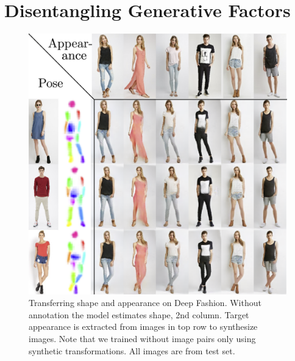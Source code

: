 \section{Disentangling Generative Factors}
	\begin{figure}[t]
		\centering
		\includegraphics[trim={0cm 0cm 0cm 0cm},clip, width=1.\linewidth]{fig/swappy}
		\caption{Transferring shape and appearance on Deep Fashion. Without annotation the model estimates shape, 2nd column. Target appearance is extracted from images in top row to synthesize images. Note that we trained without image pairs only using synthetic transformations.
		All images are from test set.}
		\label{fig:allswaps}
	\end{figure}
